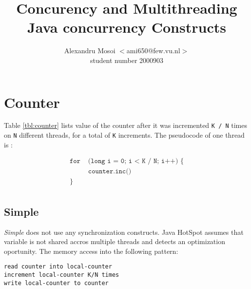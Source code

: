 \documentclass[12pt]{article}
\title{Concurency and Multithreading\\
       Java concurrency Constructs}
\author{Alexandru Mosoi $<$ami650@few.vu.nl$>$\\
        student number 2000903}
\begin{document}
\maketitle


\section{Counter}

\begin{table}[h!]
  \centering
  \small

  \caption{Counter value for variable N and K = 2.000.000.000 on a 4 logical
  cores processor}
  \label{tbl:counter}
\end{table}


Table \ref{tbl:counter} lists value of the counter after it was incremented
\texttt{K / N} times on \texttt{N} different threads, for a total of
\texttt{K} increments. The pseudocode of one thread is :

\begin{align*}
    \texttt{for\ }   &\texttt{(long i = 0; i < K / N; i++) \{} \\
    \texttt{\ \ \ \ }&\texttt{counter.inc()} \\
    \texttt{\}\ \ \ }&\texttt{} \\
\end{align*}

\subsection{Simple}

\emph{Simple} does not use any synchronization constructs. Java
HotSpot assumes that variable is not shared accros multiple threads and
detects an optimization oportunity. The memory access into the following
pattern:

\begin{verbatim}
read counter into local-counter
increment local-counter K/N times
write local-counter to counter
\end{verbatim}
\end{document}

